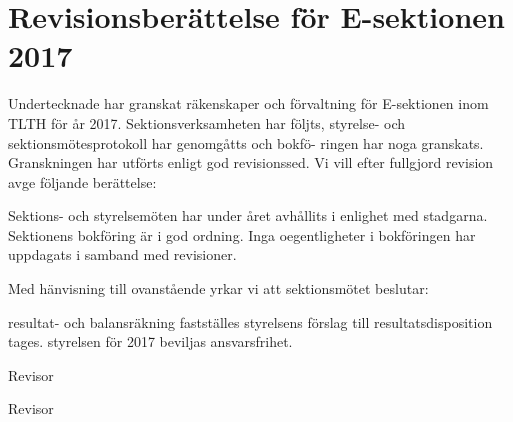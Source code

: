 \documentclass[../_main/handlingar.tex]{subfiles}
\begin{document}
\section{Revisionsberättelse för E-sektionen 2017}

Undertecknade har granskat räkenskaper och förvaltning för E-sektionen inom TLTH för år 2017.
Sektionsverksamheten har följts, styrelse- och sektionsmötesprotokoll har genomgåtts och bokfö-
ringen har noga granskats. Granskningen har utförts enligt god revisionssed. Vi vill efter fullgjord
revision avge följande berättelse:

Sektions- och styrelsemöten har under året avhållits i enlighet med stadgarna. Sektionens bokföring
är i god ordning. Inga oegentligheter i bokföringen har uppdagats i samband med revisioner.

Med hänvisning till ovanstående yrkar vi att sektionsmötet beslutar:

\begin{attsatser}
    \att resultat- och balansräkning fastställes
    \att styrelsens förslag till resultatsdisposition tages.
    \att styrelsen för 2017 beviljas ansvarsfrihet.
\end{attsatser}

\begin{signatures}{2}
    \mvh
    \signature{Jesper Ek}{Revisor}
    \signature{Cornelia Kramer}{Revisor}
\end{signatures}
\end{document}
